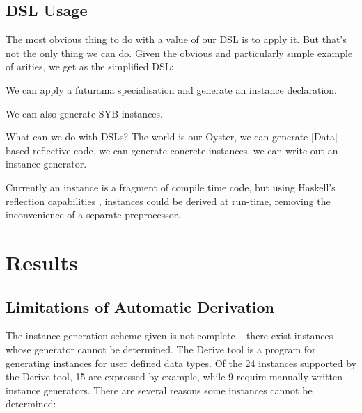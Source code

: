 \documentclass[preprint,draft]{sigplanconf}
\begin{document}
\subsection{DSL Usage}

The most obvious thing to do with a value of our DSL is to apply it. But that's not the only thing we can do. Given the obvious and particularly simple example of arities, we get as the simplified DSL:



We can apply a futurama specialisation \cite{futanama:projections} and generate an instance declaration.

We can also generate SYB instances.

What can we do with DSLs? The world is our Oyster, we can generate |Data| based reflective code, we can generate concrete instances, we can write out an instance generator.

Currently an instance is a fragment of compile time code, but using Haskell's reflection capabilities \cite{lammel:syb2}, instances could be derived at run-time, removing the inconvenience of a separate preprocessor.

\section{Results}
\label{sec:results}

\subsection{Limitations of Automatic Derivation}
\label{sec:failure}

The instance generation scheme given is not complete -- there exist instances whose generator cannot be determined. The Derive tool \cite{derive} is a program for generating instances for user defined data types. Of the 24 instances supported by the Derive tool, 15 are expressed by example, while 9 require manually written instance generators. There are several reasons some instances cannot be determined:
\end{document}
